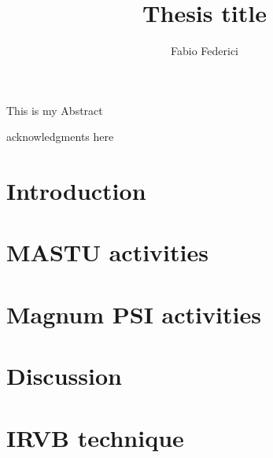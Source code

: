 \documentclass[]{yorkThesis}  %
\title{Thesis title}
\author{Fabio Federici}
\begin{document}
\titlePage
\abstract
{}
This is my Abstract

\contents

\acknowledgments
{}
acknowledgments here

\declaration



\pagestyle{headings}
\chapter{Introduction}\label{chapter1}





\chapter{MASTU activities}\label{chapter2}


\chapter{Magnum PSI activities}\label{chapter3}


\chapter{Discussion}\label{chapter4}


\appendix
\chapter{IRVB technique}\label{appendix1}

\end{document}
